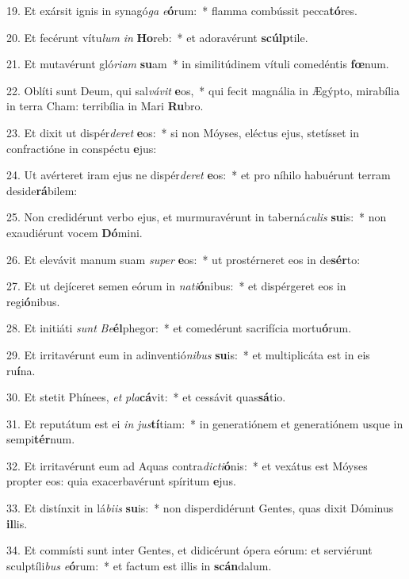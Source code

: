 19. Et exársit ignis in synagó\textit{ga} \textit{e}\textbf{ó}rum:~*  flamma combússit pecca\textbf{tó}res.\

20. Et fecérunt vítu\textit{lum} \textit{in} \textbf{Ho}reb:~*  et adoravérunt \textbf{scúlp}tile.\

21. Et mutavérunt gló\textit{ri}\textit{am} \textbf{su}am~*  in similitúdinem vítuli comedéntis \textbf{fœ}num.\

22. Oblíti sunt Deum, qui sal\textit{vá}\textit{vit} \textbf{e}os,~*  qui fecit magnália in Ægýpto, mirabília in terra Cham: terribília in Mari \textbf{Ru}bro.\

23. Et dixit ut dispér\textit{de}\textit{ret} \textbf{e}os:~*  si non Móyses, eléctus ejus, stetísset in confractióne in conspéctu \textbf{e}jus:\

24. Ut avérteret iram ejus ne dispér\textit{de}\textit{ret} \textbf{e}os:~*  et pro níhilo habuérunt terram deside\textbf{rá}bilem:\

25. Non credidérunt verbo ejus, et murmuravérunt in taberná\textit{cu}\textit{lis} \textbf{su}is:~*  non exaudiérunt vocem \textbf{Dó}mini.\

26. Et elevávit manum suam \textit{su}\textit{per} \textbf{e}os:~*  ut prostérneret eos in de\textbf{sér}to:\

27. Et ut dejíceret semen eórum in \textit{na}\textit{ti}\textbf{ó}nibus:~*  et dispérgeret eos in regi\textbf{ó}nibus.\

28. Et initiáti \textit{sunt} \textit{Be}\textbf{él}phegor:~*  et comedérunt sacrifícia mortu\textbf{ó}rum.\

29. Et irritavérunt eum in adinventió\textit{ni}\textit{bus} \textbf{su}is:~*  et multiplicáta est in eis ru\textbf{í}na.\

30. Et stetit Phínees, \textit{et} \textit{pla}\textbf{cá}vit:~*  et cessávit quas\textbf{sá}tio.\

31. Et reputátum est ei \textit{in} \textit{jus}\textbf{tí}tiam:~*  in generatiónem et generatiónem usque in sempi\textbf{tér}num.\

32. Et irritavérunt eum ad Aquas contra\textit{dic}\textit{ti}\textbf{ó}nis:~*  et vexátus est Móyses propter eos: quia exacerbavérunt spíritum \textbf{e}jus.\

33. Et distínxit in lá\textit{bi}\textit{is} \textbf{su}is:~*  non disperdidérunt Gentes, quas dixit Dóminus \textbf{il}lis.\

34. Et commísti sunt inter Gentes, et didicérunt ópera eórum: et serviérunt sculptíli\textit{bus} \textit{e}\textbf{ó}rum:~*  et factum est illis in \textbf{scán}dalum.\

